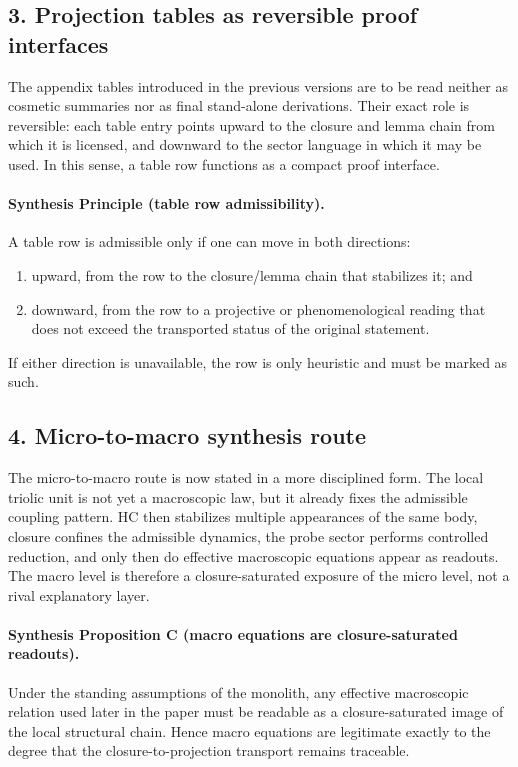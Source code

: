 \subsection*{3. Projection tables as reversible proof interfaces}
The appendix tables introduced in the previous versions are to be read neither
as cosmetic summaries nor as final stand-alone derivations. Their exact role is
reversible: each table entry points upward to the closure and lemma chain from
which it is licensed, and downward to the sector language in which it may be
used. In this sense, a table row functions as a compact proof interface.

\paragraph{Synthesis Principle (table row admissibility).}
A table row is admissible only if one can move in both directions:
\begin{enumerate}[leftmargin=2em,label=(\alph*)]
 \item upward, from the row to the closure/lemma chain that stabilizes it; and
 \item downward, from the row to a projective or phenomenological reading that
 does not exceed the transported status of the original statement.
\end{enumerate}
If either direction is unavailable, the row is only heuristic and must be marked
as such.

\subsection*{4. Micro-to-macro synthesis route}
The micro-to-macro route is now stated in a more disciplined form. The local
triolic unit is not yet a macroscopic law, but it already fixes the admissible
coupling pattern. HC then stabilizes multiple appearances of the same body,
closure confines the admissible dynamics, the probe sector performs controlled
reduction, and only then do effective macroscopic equations appear as readouts.
The macro level is therefore a closure-saturated exposure of the micro level,
not a rival explanatory layer.

\paragraph{Synthesis Proposition C (macro equations are closure-saturated readouts).}
Under the standing assumptions of the monolith, any effective macroscopic
relation used later in the paper must be readable as a closure-saturated image
of the local structural chain. Hence macro equations are legitimate exactly to
the degree that the closure-to-projection transport remains traceable.

